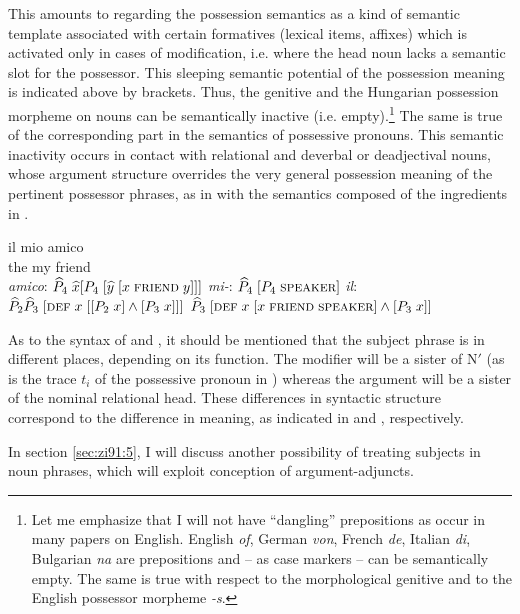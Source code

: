 \documentclass[output=paper,colorlinks,citecolor=brown]{langscibook}
\begin{document}
\noindent This amounts to regarding the possession semantics as a kind of semantic template associated with certain formatives (lexical items, affixes) which is activated only in cases of modification, i.e. where the head noun lacks a semantic slot for the possessor. This sleeping semantic potential of the possession meaning is indicated above by brackets. Thus, the genitive and the Hungarian possession morpheme on nouns can be semantically inactive (i.e. empty).\footnote{Let me emphasize that I will not have “dangling” prepositions as occur in many papers on English. English \textit{of}, German \textit{von}, French \textit{de}, Italian \textit{di}, Bulgarian \textit{na} are prepositions and -- as case markers -- can be semantically empty. The same is true with respect to the morphological genitive and to the English possessor morpheme \textit{-s}.} The same is true of the corresponding part in the semantics of possessive pronouns. This semantic inactivity occurs in contact with relational and deverbal or deadjectival nouns, whose argument structure overrides the very general possession meaning of the pertinent possessor phrases, as in  with the semantics  composed of the ingredients in .

\ea \label{ex:zi91:35} 
\gll il mio amico \\
the my friend \\
\glt
\ex \label{ex:zi91:36}
    \ea \label{ex:zi91:36a} \textit{amico}: ${\widehat{P}}_{4} \; \widehat{x} [{P}_{4} \; [\widehat{y} \; [x \; \textsc{friend} \; y]]]$
    \ex \label{ex:zi91:36b} \textit{mi-}: $\widehat{P}_{4} \; [P_{4} \; \textsc{speaker}]$
    \ex \label{ex:zi91:36c} \textit{il}: $\widehat{P}_{2} \widehat{P}_{3} \; [\textsc{def} \; x \; [[P_{2} \; x] \wedge [P_{3} \; x]]]$
    \z
\ex \label{ex:zi91:37} $\widehat{P}_3 \; [\textsc{def} \; x \; [x \; \textsc{friend} \; \textsc{speaker}] \wedge [P_{3} \; x]]$
\z

\noindent As to the syntax of  and , it should be mentioned that the subject phrase is in different places, depending on its function. The modifier will be a sister of N$'$ (as is the trace $t_i$ of the possessive pronoun in ) whereas the argument will be a sister of the nominal relational head. These differences in syntactic structure correspond to the difference in meaning, as indicated in  and , respectively.

In section \ref{sec:zi91:5}, I will discuss another possibility of treating subjects in noun phrases, which will exploit  conception of argument-adjuncts.
\end{document}
